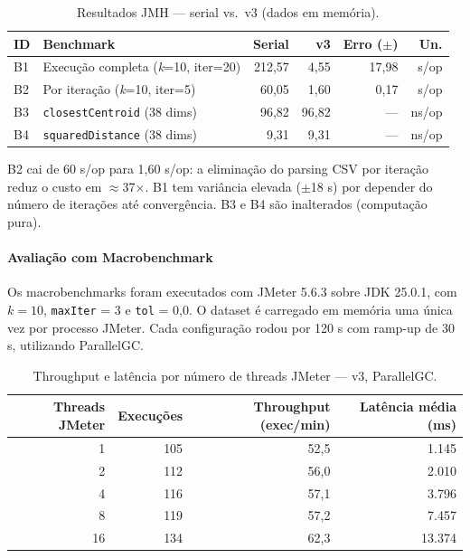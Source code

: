\begin{table}[H]
\centering
\begin{tabular}{lp{4.2cm}rrrr}
\hline
\textbf{ID} & \textbf{Benchmark} & \textbf{Serial} & \textbf{v3} & \textbf{Erro ($\pm$)} & \textbf{Un.} \\
\hline
B1 & Execução completa (\textit{k}=10, iter=20) & 212{,}57 &  4{,}55 & 17{,}98 & s/op \\
B2 & Por iteração (\textit{k}=10, iter=5)        &  60{,}05 &  1{,}60 &  0{,}17 & s/op \\
B3 & \texttt{closestCentroid} (38 dims)           &  96{,}82 & 96{,}82 &     --- & ns/op \\
B4 & \texttt{squaredDistance} (38 dims)           &   9{,}31 &  9{,}31 &     --- & ns/op \\
\hline
\end{tabular}
\caption{Resultados JMH --- serial vs.\ v3 (dados em memória).}
\label{tab:jmh-v3}
\end{table}

B2 cai de 60 s/op para 1{,}60 s/op: a eliminação do parsing CSV por iteração reduz
o custo em $\approx$37$\times$. B1 tem variância elevada ($\pm$18 s) por depender
do número de iterações até convergência. B3 e B4 são inalterados (computação pura).

\paragraph{Avaliação com Macrobenchmark}

Os macrobenchmarks foram executados com JMeter 5.6.3 sobre JDK 25.0.1, com
$k = 10$, \texttt{maxIter} = 3 e \texttt{tol} = 0{,}0. O dataset é carregado em
memória uma única vez por processo JMeter. Cada configuração rodou por 120 s com
ramp-up de 30 s, utilizando ParallelGC.

\begin{table}[H]
\centering
\begin{tabular}{rrrr}
\hline
\textbf{Threads JMeter} & \textbf{Execuções} & \textbf{Throughput (exec/min)} & \textbf{Latência média (ms)} \\
\hline
 1 & 105 & 52{,}5 &  1{.}145 \\
 2 & 112 & 56{,}0 &  2{.}010 \\
 4 & 116 & 57{,}1 &  3{.}796 \\
 8 & 119 & 57{,}2 &  7{.}457 \\
16 & 134 & 62{,}3 & 13{.}374 \\
\hline
\end{tabular}
\caption{Throughput e latência por número de threads JMeter --- v3, ParallelGC.}
\label{tab:jmeter-v3}
\end{table}

